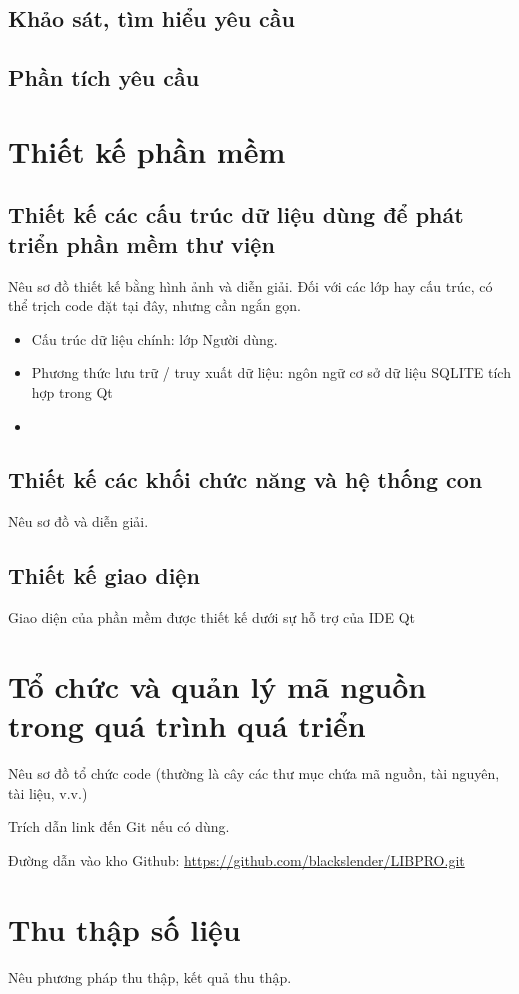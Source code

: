 \documentclass[a4paper]{article}
\begin{document}
\subsection{Khảo sát, tìm hiểu yêu cầu}
\subsection{Phần tích yêu cầu}


\section{Thiết kế phần mềm}
\subsection{Thiết kế các cấu trúc dữ liệu dùng để phát triển phần mềm thư viện}
Nêu sơ đồ thiết kế bằng hình ảnh và diễn giải. Đối với các lớp hay cấu trúc, có thể trịch code đặt tại đây, nhưng cần ngắn gọn.
\begin{itemize}
	\item Cấu trúc dữ liệu chính: lớp Người dùng.\\
	\item Phương thức lưu trữ / truy xuất dữ liệu: ngôn ngữ cơ sở dữ liệu SQLITE tích hợp trong Qt
	\item 
\end{itemize}

\subsection{Thiết kế các khối chức năng và hệ thống con}
Nêu sơ đồ và diễn giải.

\subsection{Thiết kế giao diện}
Giao diện của phần mềm được thiết kế dưới sự hỗ trợ của IDE Qt

\section{Tổ chức và quản lý mã nguồn trong quá trình quá triển}
Nêu sơ đồ tổ chức code (thường là cây các thư mục chứa mã nguồn, tài nguyên, tài liệu, v.v.)

Trích dẫn link đến Git nếu có dùng.

Đường dẫn vào kho Github: \url{https://github.com/blackslender/LIBPRO.git}
\section{Thu thập số liệu}
Nêu phương pháp thu thập, kết quả thu thập.
\end{document}
